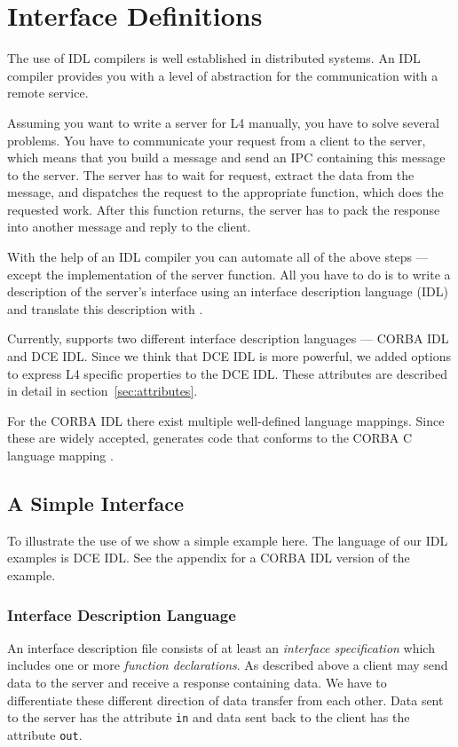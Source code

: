 \chapter{Interface Definitions}
\label{section1}

The use of IDL compilers is well established 
in distributed systems. An IDL compiler provides you
with a level of abstraction for the communication with a 
remote service.

Assuming you want to write a server for L4 manually, you
have to solve several problems. You have to communicate
your request from a client to the server, which means that you
build a message and send an IPC containing this message
to the server. The server has to wait for request,
extract the data from the message, and dispatches the
request to the appropriate function, which does the
requested work. After this function returns, the server
has to pack the response into another message and reply
to the client.

With the help of an IDL compiler you can automate all of the
above steps --- except the implementation of the server
function. All you have to do is to write a description of the 
server's interface using an interface description language 
(IDL) and translate this description with \dice{}.

Currently, \dice{} supports two different interface
description languages --- CORBA 
IDL and DCE IDL. Since we think that DCE IDL is more
powerful, we added options to express
L4 specific properties to the DCE IDL. These attributes
are described in detail in section~\ref{sec:attributes}.

For the CORBA IDL there exist multiple well-defined 
language mappings. Since these are widely accepted,
\dice{} generates code that conforms to the CORBA C
language mapping \cite{corba-clm}.

\section{A Simple Interface}

To illustrate the use of \dice{} we show a simple example
here. The language of our IDL examples is DCE IDL. See
the appendix for a CORBA IDL version of the example.

\subsection{Interface Description Language}
An interface description file consists of at least an {\em interface
specification} which includes one or more {\em function declarations}.
As described above a client may send data to the server and
receive a response containing data. We have to differentiate
these different direction of data transfer from each other. Data sent to
the server has the attribute \verb|in| and data sent back to
the client has the attribute \verb|out|.


